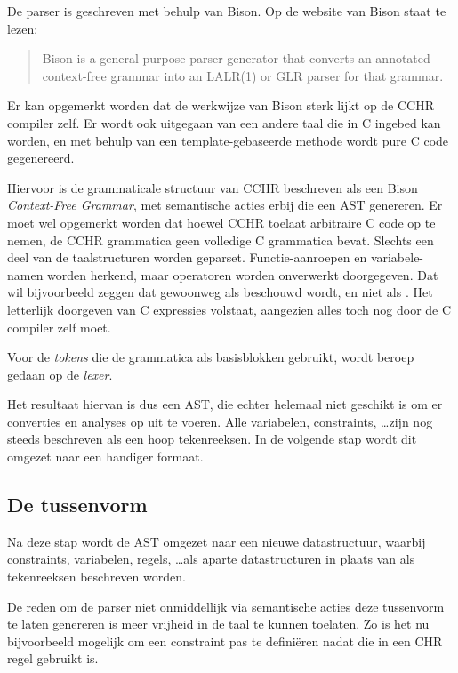 De parser is geschreven met behulp van Bison. Op de website van Bison staat te lezen: \begin{quote}
  Bison is a general-purpose parser generator that converts an annotated context-free grammar into an LALR(1) or GLR parser for that grammar.
\end{quote}

Er kan opgemerkt worden dat de werkwijze van Bison sterk lijkt op de CCHR compiler zelf. Er wordt ook uitgegaan van een andere taal die in C ingebed kan worden, en met behulp van een template-gebaseerde methode wordt pure C code gegenereerd.

Hiervoor is de grammaticale structuur van CCHR beschreven als een Bison {\em Context-Free Grammar}, met semantische acties erbij die een AST genereren. Er moet wel opgemerkt worden dat hoewel CCHR toelaat arbitraire C code op te nemen, de CCHR grammatica geen volledige C grammatica bevat. Slechts een deel van de taalstructuren worden geparset. Functie-aanroepen en variabele-namen worden herkend, maar operatoren worden onverwerkt doorgegeven. Dat wil bijvoorbeeld zeggen dat  gewoonweg als  beschouwd wordt, en niet als . Het letterlijk doorgeven van C expressies volstaat, aangezien alles toch nog door de C compiler zelf moet.

Voor de {\em tokens} die de grammatica als basisblokken gebruikt, wordt beroep gedaan op de {\em lexer}.

Het resultaat hiervan is dus een AST, die echter helemaal niet geschikt is om er converties en analyses op uit te voeren. Alle variabelen, constraints, \ldots zijn nog steeds beschreven als een hoop tekenreeksen. In de volgende stap wordt dit omgezet naar een handiger formaat. 

\subsection{De tussenvorm} \label{sec:tussenvorm}

Na deze stap wordt de AST omgezet naar een nieuwe datastructuur, waarbij constraints, variabelen, regels, \ldots als aparte datastructuren in plaats van als tekenreeksen beschreven worden. 

De reden om de parser niet onmiddellijk via semantische acties deze tussenvorm te laten genereren is meer vrijheid in de taal te kunnen toelaten. Zo is het nu bijvoorbeeld mogelijk om een constraint pas te defini\"eren nadat die in een CHR regel gebruikt is.

